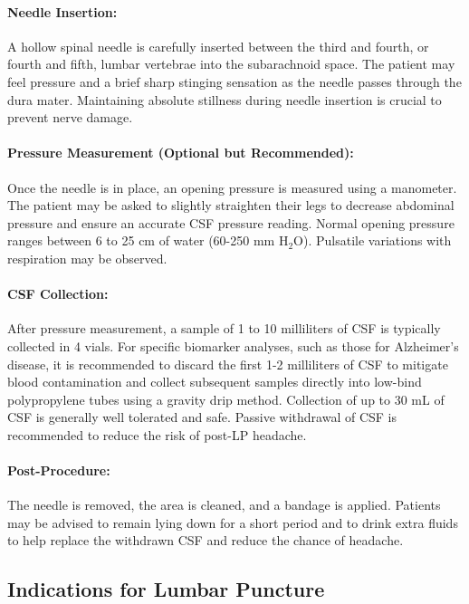 \paragraph{Needle Insertion:} A hollow spinal needle is carefully inserted between the third and fourth, or fourth and fifth, lumbar vertebrae into the subarachnoid space. The patient may feel pressure and a brief sharp stinging sensation as the needle passes through the dura mater. Maintaining absolute stillness during needle insertion is crucial to prevent nerve damage.
	
\paragraph{Pressure Measurement (Optional but Recommended):} Once the needle is in place, an opening pressure is measured using a manometer. The patient may be asked to slightly straighten their legs to decrease abdominal pressure and ensure an accurate CSF pressure reading. Normal opening pressure ranges between 6 to 25 cm of water (60-250 mm H$_2$O). Pulsatile variations with respiration may be observed.
	
\paragraph{CSF Collection:} After pressure measurement, a sample of 1 to 10 milliliters of CSF is typically collected in 4 vials. For specific biomarker analyses, such as those for Alzheimer's disease, it is recommended to discard the first 1-2 milliliters of CSF to mitigate blood contamination and collect subsequent samples directly into low-bind polypropylene tubes using a gravity drip method. Collection of up to 30 mL of CSF is generally well tolerated and safe. Passive withdrawal of CSF is recommended to reduce the risk of post-LP headache.
	
\paragraph{Post-Procedure:} The needle is removed, the area is cleaned, and a bandage is applied. Patients may be advised to remain lying down for a short period and to drink extra fluids to help replace the withdrawn CSF and reduce the chance of headache.
	
\subsection{Indications for Lumbar Puncture}
	

